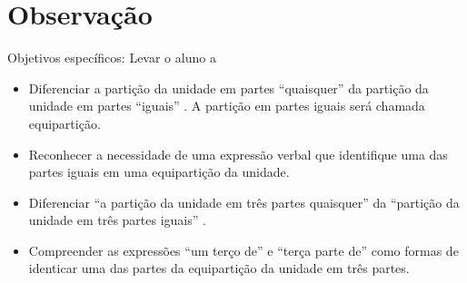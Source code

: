 \documentclass{book}
\begin{document}

\section{Observação}   Objetivos específicos: Levar o aluno a
\begin{itemize} %
    \item       Diferenciar a partição da unidade em partes       ``quaisquer''       da partição da unidade em partes       ``iguais''      . A partição em partes iguais será chamada equipartição.
    \item       Reconhecer a necessidade de uma expressão verbal que identifique uma das partes iguais em uma equipartição da unidade.
    \item       Diferenciar       ``a partição da unidade em três partes quaisquer''       da       ``partição da unidade em três partes iguais''      .
    \item       Compreender as expressões       ``um terço de''       e       ``terça parte de''       como formas de identicar uma das partes da equipartição da unidade em três partes.
\end{itemize} %
\end{document}

